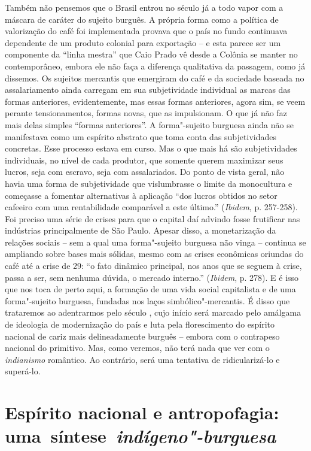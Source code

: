 {Também não pensemos que o Brasil entrou no século  já a todo vapor
com a máscara de caráter do sujeito burguês. A própria forma como a
política de valorização do café foi implementada provava que o país no
fundo continuava dependente de um produto colonial para exportação -- e
esta parece ser um componente da ``linha mestra'' que Caio Prado vê
desde a Colônia se manter no contemporâneo, embora ele não faça a
diferença qualitativa da passagem, como já dissemos. Os sujeitos
mercantis que emergiram do café e da sociedade baseada no assalariamento
ainda carregam em sua subjetividade individual as marcas das formas
anteriores, evidentemente, mas essas formas anteriores, agora sim, se
veem perante tensionamentos, formas novas, que as impulsionam. O que já
não faz mais delas simples ``formas anteriores''. A forma"-sujeito
burguesa ainda não se manifestava como um espírito abstrato que toma
conta das subjetividades concretas. Esse processo estava em curso. Mas o
que mais há são subjetividades individuais, no nível de cada produtor,
que somente querem maximizar seus lucros, seja com escravo, seja com
assalariados. Do ponto de vista geral, não havia uma forma de
subjetividade que vislumbrasse o limite da monocultura e começasse a
fomentar alternativas à aplicação ``dos lucros obtidos no setor cafeeiro
com uma rentabilidade comparável a este último.'' (\emph{Ibidem}, p.
257-258). Foi preciso uma série de crises para que o capital daí advindo
fosse frutificar nas indústrias principalmente de São Paulo. Apesar
disso, a monetarização da relações sociais -- sem a qual uma
forma"-sujeito burguesa não vinga -- continua se ampliando sobre bases
mais sólidas, mesmo com as crises econômicas oriundas do café até a
crise de 29: ``o fato dinâmico principal, nos anos que se seguem à
crise, passa a ser, sem nenhuma dúvida, o mercado interno.''
(\emph{Ibidem}, p. 278). E é isso que nos toca de perto aqui, a formação
de uma vida social capitalista e de uma forma"-sujeito burguesa, fundadas
nos laços simbólico"-mercantis. É disso que trataremos ao adentrarmos
pelo século , cujo início será marcado pelo amálgama de ideologia de
modernização do país e luta pela florescimento do espírito nacional de
cariz mais delineadamente burguês -- embora com o contrapeso nacional do
primitivo. Mas, como veremos, não terá nada que ver com o
\emph{indianismo} romântico. Ao contrário, será uma tentativa de
ridicularizá-lo e superá-lo.

\section*{Espírito nacional e antropofagia: uma~síntese~\emph{indígeno"-burguesa}}

}
